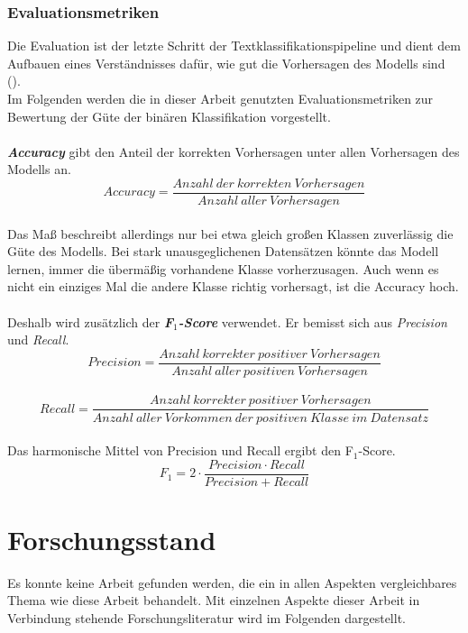 \documentclass[ngerman]{ttlab-qualify}
\begin{document}
\subsection{Evaluationsmetriken} \label{Evaluationsmetriken}
Die Evaluation ist der letzte Schritt der Textklassifikationspipeline und dient dem Aufbauen eines Verständnisses dafür, wie gut die Vorhersagen des Modells sind (\cite{Kowsari_2019}).\\ 
Im Folgenden werden die in dieser Arbeit genutzten Evaluationsmetriken zur Bewertung der Güte der binären Klassifikation vorgestellt.\\
\\
\textbf{\textit{Accuracy}} gibt den Anteil der korrekten Vorhersagen unter allen Vorhersagen des Modells an.\\
\[Accuracy = \dfrac{Anzahl\ der\ korrekten\ Vorhersagen}{Anzahl\ aller\ Vorhersagen}\]
\\
Das Maß beschreibt allerdings nur bei etwa gleich großen Klassen zuverlässig die Güte des Modells. Bei stark unausgeglichenen Datensätzen könnte das Modell lernen, immer die übermäßig vorhandene Klasse vorherzusagen. Auch wenn es nicht ein einziges Mal die andere Klasse richtig vorhersagt, ist die Accuracy hoch.\\
\\
Deshalb wird zusätzlich der \textbf{\textit{F$_{1}$-Score}} verwendet. Er bemisst sich aus \textit{Precision} und \textit{Recall}.\\
\[Precision = \dfrac{Anzahl\ korrekter\ positiver\ Vorhersagen}{Anzahl\ aller\ positiven\ Vorhersagen}\]
\\
\[Recall = \dfrac{Anzahl\ korrekter\ positiver\ Vorhersagen}{Anzahl\ aller\ Vorkommen\ der\ positiven\ Klasse\ im\ Datensatz}\]
\\Das harmonische Mittel von Precision und Recall ergibt den F$_{1}$-Score.
\[F_{1} = 2 \cdot \dfrac{Precision \cdot Recall}{Precision + Recall}\]


\chapter{Forschungsstand}
Es konnte keine Arbeit gefunden werden, die ein in allen Aspekten vergleichbares Thema wie diese Arbeit behandelt. Mit einzelnen Aspekte dieser Arbeit in Verbindung stehende Forschungsliteratur wird im Folgenden dargestellt.
\end{document}
